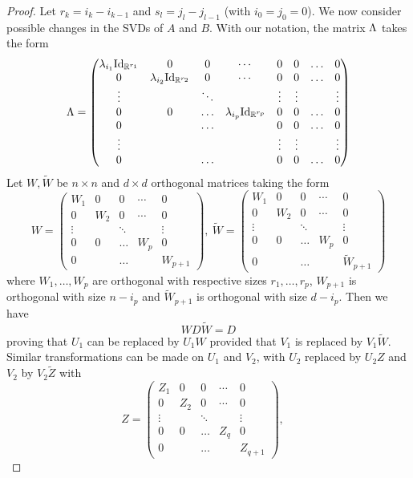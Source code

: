 \begin{proof}
Let $r_k = i_k - i_{k-1}$ and $s_l = j_l - j_{l-1}$ (with $i_0=j_0=0$).
We now consider possible changes in the SVDs of $A$ and $B$. With our notation, the matrix $\Lambda$ takes the form
\[
\Lambda = \begin{pmatrix}
\la_{i_1} \Id[r_1] & 0 & 0 & \cdots & 0 &0 &\ldots& 0 \\
0 & \la_{i_2} \Id[r_2] & 0 & \cdots & 0 &0 &\ldots& 0\\
\vdots &  &\ddots & &\vdots &\vdots&&\vdots\\
0 & 0 & \ldots & \la_{i_p} \Id[r_p] & 0 &0 &\ldots& 0\\
0 &&\ldots && 0&0 &\ldots& 0\\
\vdots &&&&\vdots &\vdots&&\vdots\\
0 &&\ldots && 0 &0 &\ldots& 0
\end{pmatrix}
\]
Let $W, \tilde W$ be  $n\times n$ and $d\times d$ orthogonal matrices taking the form
\[
W = \begin{pmatrix}
W_1 & 0 & 0 & \cdots & 0 \\
0 & W_2 & 0 & \cdots & 0\\
\vdots &  &\ddots & &\vdots \\
0 & 0 & \ldots & W_p & 0 \\
0 &&\ldots && W_{p+1}
\end{pmatrix},\ 
\tilde W = \begin{pmatrix}
W_1 & 0 & 0 & \cdots & 0 \\
0 & W_2 & 0 & \cdots & 0\\
\vdots &  &\ddots & &\vdots \\
0 & 0 & \ldots & W_p & 0 \\
0 &&\ldots && \tilde W_{p+1}
\end{pmatrix}
\]
where $W_1, \ldots, W_p$ are orthogonal with respective sizes $r_1, \ldots, r_p$, $W_{p+1}$ is orthogonal with size $n-i_p$ and $\tilde W_{p+1}$ is orthogonal with size $d-i_p$. Then we have
\[
WD\tilde W = D
\]
proving that $U_1$ can be replaced by $U_1W$ provided that $V_1$ is replaced by $V_1 \tilde  W$.  Similar transformations can be made on $U_1$ and $V_2$, with $U_2$ replaced by $U_2 Z$ and $V_2 $ by $V_2 \tilde Z$ with 
\[
Z = \begin{pmatrix}
Z_1 & 0 & 0 & \cdots & 0 \\
0 & Z_2 & 0 & \cdots & 0\\
\vdots &  &\ddots & &\vdots \\
0 & 0 & \ldots & Z_q & 0 \\
0 &&\ldots && Z_{q+1}
\end{pmatrix},\quad 
\]
\end{proof}
